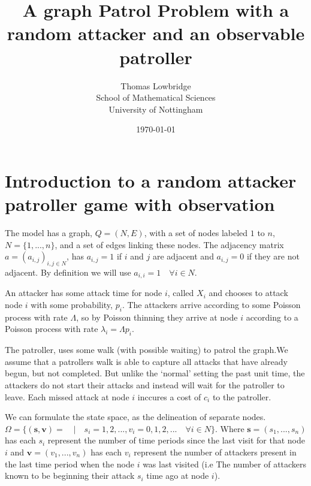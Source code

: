 \documentclass[a4paper,10pt]{article}
\title{A graph Patrol Problem with a random attacker and an observable patroller}
\date{\today}
\author{Thomas Lowbridge \\ School of Mathematical Sciences \\ University of Nottingham}
\theoremstyle{definition}
\theoremstyle{definition}
\theoremstyle{remark}
\theoremstyle{definition}
\begin{document}
\pagestyle{empty}
{
  \renewcommand{\thispagestyle}[1]{}
  \maketitle
  \tableofcontents  
}
\clearpage
\pagestyle{plain}


\setlength{\parindent}{0pt}
\setlength{\parskip}{1em}

\newpage
{}
\section{Introduction to a random attacker patroller game with observation}
The model has a graph, $Q=(N,E)$, with a set of nodes labeled $1$ to $n$, $N=\{1,...,n \}$, and a set of edges linking these nodes. The adjacency matrix $a=(a_{i,j})_{i,j \in N}$, has $a_{i,j}=1$ if $i$ and $j$ are adjacent and $a_{i,j}=0$ if they are not adjacent. By definition we will use $a_{i,i}=1 \quad \forall i \in N$.


An attacker has some attack time for node $i$, called $X_{i}$ and chooses to attack node $i$ with some probability, $p_{i}$. The attackers arrive according to some Poisson process with rate $\Lambda$, so by Poisson thinning they arrive at node $i$ according to a Poisson process with rate $\lambda_{i}=\Lambda p_{i}$.

The patroller, uses some walk (with possible waiting) to patrol the graph.We assume that a patrollers walk is able to capture all attacks that have already begun, but not completed. But unlike the `normal' setting the past unit time, the attackers do not start their attacks and instead will wait for the patroller to leave. Each missed attack at node $i$ inccures a cost of $c_{i}$ to the patroller.

We can formulate the state space, as the delineation of separate nodes. $\Omega= \{ (\bm{s},\bm{v})= \quad | \quad s_{i}=1,2,... , v_{i}=0,1,2,... \quad \forall i \in N \}$. Where $\bm{s}=(s_{1},...,s_{n})$ has each $s_{i}$ represent the number of time periods since the last visit for that node $i$ and $\bm{v}=(v_{1},...,v_{n})$ has each $v_{i}$ represent the number of attackers present in the last time period when the node $i$ was last visited (i.e The number of attackers known to be beginning their attack $s_{i}$ time ago at node $i$).
\end{document}

